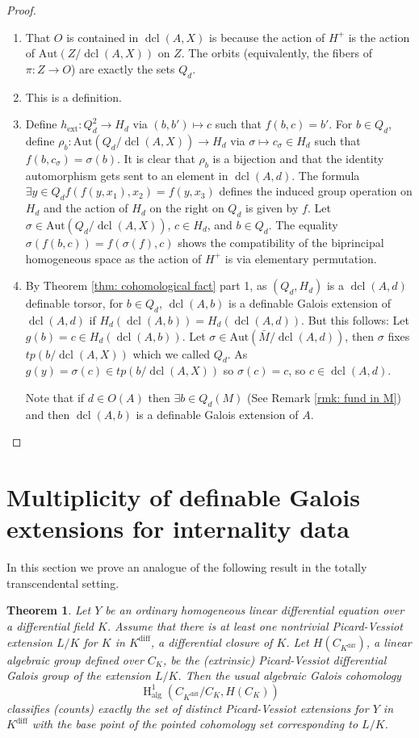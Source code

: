 \documentclass{amsart}
\newtheorem{theorem}{Theorem}[section]
\theoremstyle{definition}
\theoremstyle{remark}
\numberwithin{equation}{section}
\def \tp {tp}
\def \HH {\operatorname{H}}
\def \diff {\operatorname{diff}}
\def \alg {\operatorname{alg}}
\def \aut {\text{Aut}}
\def \dcl {\operatorname{dcl}}
\begin{document}
\begin{proof}
\begin{enumerate}
        \item That $O$ is contained in $\dcl(A,X)$ is because the action of $H^+$ is the action of $\aut(Z/\dcl(A,X))$ on $Z$. The orbits (equivalently, the fibers of $\pi:Z \to O$) are exactly the sets $Q_d$.

        \item This is a definition. 

        \item Define $h_{\text{ext}}:Q_d^2 \to H_d$ via $(b,b') \mapsto c$ such that $f(b,c) = b'$. For $b \in Q_d$, define $\rho_b:\aut(Q_d/\dcl(A,X)) \to H_d$ via $\sigma \mapsto c_\sigma \in H_d$ such that $f(b,c_\sigma) = \sigma(b)$. It is clear that $\rho_b$ is a bijection and that the identity automorphism gets sent to an element in $\dcl(A,d)$. The formula $\exists y \in Q_d f(f(y,x_1),x_2) = f(y,x_3)$ defines the induced group operation on $H_d$ and the action of $H_d$ on the right on $Q_d$ is given by $f$. Let $\sigma \in \aut(Q_d/\dcl(A,X))$, $c \in H_d$, and $b \in Q_d$. The equality $\sigma(f(b,c)) = f(\sigma(f),c)$ shows the compatibility of the biprincipal homogeneous space as the action of $H^+$ is via elementary permutation.

        \item By Theorem \ref{thm: cohomological fact} part 1, as $(Q_d,H_d)$ is a $\dcl(A,d)$ definable torsor, for $b \in Q_d$, $\dcl(A,b)$ is a definable Galois extension of $\dcl(A,d)$ if  $H_d(\dcl(A,b)) = H_d(\dcl(A,d))$. But this follows: Let $g(b) = c \in H_d(\dcl(A,b))$. Let $\sigma \in \aut(\bar{M}/\dcl(A,d))$, then $\sigma$ fixes $\tp(b/\dcl(A,X))$ which we called $Q_d$. As $g(y) = \sigma(c) \in \tp(b/\dcl(A,X))$ so $\sigma(c) = c$, so $c \in \dcl(A,d)$.
        
        Note that if $d \in O(A)$ then $\exists b \in Q_d(M)$ (See Remark \ref{rmk: fund in M}) and then $\dcl(A,b)$ is a definable Galois extension of $A$.
        \end{enumerate}
\end{proof}

\section{Multiplicity of definable Galois extensions for internality data}\label{sec: mult}

In this section we prove an analogue of the following result in the totally transcendental setting.

\begin{theorem}\cite{DeligneMilne2022} Let $Y$ be an ordinary homogeneous linear differential equation over a differential field $K$. Assume that there is at least one nontrivial Picard-Vessiot extension $L/K$ for $K$ in $K^{\diff}$, a differential closure of $K$. Let $H(C_{K^{\diff}})$, a linear algebraic group defined over $C_K$, be the (extrinsic) Picard-Vessiot differential Galois group of the extension $L/K$. Then the usual algebraic Galois cohomology $$\HH^1_{\alg}(C_{K^{\diff}}/C_K,H(C_K))$$
classifies (counts) exactly the set of distinct Picard-Vessiot extensions for $Y$ in $K^{\diff}$ with the base point of the pointed cohomology set corresponding to $L/K$.
\end{theorem}
\end{document}
